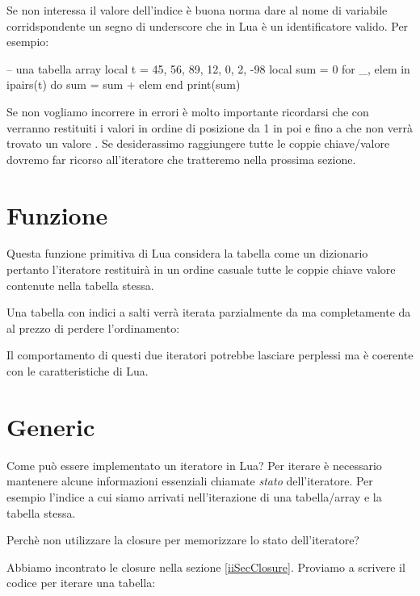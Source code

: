 Se non interessa il valore dell'indice è buona norma dare al nome di variabile
corridspondente un segno di underscore \key{\_} che in Lua è un identificatore
valido. Per esempio:
\begin{lines}
-- una tabella array
local t = {45, 56, 89, 12, 0, 2, -98}
local sum = 0
for _, elem in ipairs(t) do
    sum = sum + elem
end
print(sum)
\end{lines}

Se non vogliamo incorrere in errori è molto importante ricordarsi che con
 verranno restituiti i valori in ordine di posizione da 1 in poi e
fino a che non verrà trovato un valore . Se desiderassimo raggiungere
tutte le coppie chiave/valore dovremo far ricorso all'iteratore 
che tratteremo nella prossima sezione.


\section{Funzione }
\label{iiSecPairsIterator}

Questa funzione primitiva di Lua considera la tabella come un dizionario
pertanto l'iteratore restituirà in un ordine casuale tutte le coppie chiave
valore contenute nella tabella stessa.

Una tabella con indici a salti verrà iterata parzialmente da  ma
completamente da  al prezzo di perdere l'ordinamento:

Il comportamento di questi due iteratori potrebbe lasciare perplessi ma è
coerente con le caratteristiche di Lua.


\section{Generic }

Come può essere implementato un iteratore in Lua? Per iterare è necessario
mantenere alcune informazioni essenziali chiamate \emph{stato} dell'iteratore.
Per esempio l'indice a cui siamo arrivati nell'iterazione di una tabella/array
e la tabella stessa.

Perchè non utilizzare la closure per memorizzare lo stato dell'iteratore?

Abbiamo incontrato le closure nella sezione \ref{iiSecClosure}. Proviamo a
scrivere il codice per iterare una tabella:


